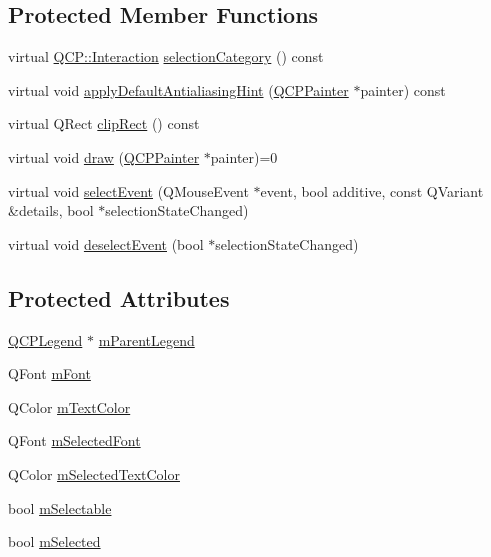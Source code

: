 \subsection*{Protected Member Functions}
\begin{DoxyCompactItemize}
\item 
virtual \hyperlink{namespace_q_c_p_a2ad6bb6281c7c2d593d4277b44c2b037}{Q\+C\+P\+::\+Interaction} \hyperlink{class_q_c_p_abstract_legend_item_a53a80054ab329beaca072fb08c08944b}{selection\+Category} () const 
\item 
virtual void \hyperlink{class_q_c_p_abstract_legend_item_a71c3baeda42ba78d2cccd97e74110a5e}{apply\+Default\+Antialiasing\+Hint} (\hyperlink{class_q_c_p_painter}{Q\+C\+P\+Painter} $\ast$painter) const 
\item 
virtual Q\+Rect \hyperlink{class_q_c_p_abstract_legend_item_abcb540c331b49ef7ee0ea1abbd0dcac3}{clip\+Rect} () const 
\item 
virtual void \hyperlink{class_q_c_p_abstract_legend_item_a97dedc084c672359710f16b31d046d1d}{draw} (\hyperlink{class_q_c_p_painter}{Q\+C\+P\+Painter} $\ast$painter)=0
\item 
virtual void \hyperlink{class_q_c_p_abstract_legend_item_abcfe9e335d99c7fac74e03d26723c1b7}{select\+Event} (Q\+Mouse\+Event $\ast$event, bool additive, const Q\+Variant \&details, bool $\ast$selection\+State\+Changed)
\item 
virtual void \hyperlink{class_q_c_p_abstract_legend_item_ae64e667e7c5b85cd92c9b91928faef28}{deselect\+Event} (bool $\ast$selection\+State\+Changed)
\end{DoxyCompactItemize}
\subsection*{Protected Attributes}
\begin{DoxyCompactItemize}
\item 
\hyperlink{class_q_c_p_legend}{Q\+C\+P\+Legend} $\ast$ \hyperlink{class_q_c_p_abstract_legend_item_aafcd9fc6fcb10f4a8d46037011afafe8}{m\+Parent\+Legend}
\item 
Q\+Font \hyperlink{class_q_c_p_abstract_legend_item_ae916a78ac0d2a60e20a17ca2f24f9754}{m\+Font}
\item 
Q\+Color \hyperlink{class_q_c_p_abstract_legend_item_a974b21e9930227d281344bd2242d289d}{m\+Text\+Color}
\item 
Q\+Font \hyperlink{class_q_c_p_abstract_legend_item_ab971df604306b192875a7d097feb1e21}{m\+Selected\+Font}
\item 
Q\+Color \hyperlink{class_q_c_p_abstract_legend_item_a4965c13854d970b24c284f0a4f005fbd}{m\+Selected\+Text\+Color}
\item 
bool \hyperlink{class_q_c_p_abstract_legend_item_aa84029f57b1b32f642fb7db63c3fc2c2}{m\+Selectable}
\item 
bool \hyperlink{class_q_c_p_abstract_legend_item_ae58ebebbd0c36cc6fe897483369984d2}{m\+Selected}
\end{DoxyCompactItemize}
